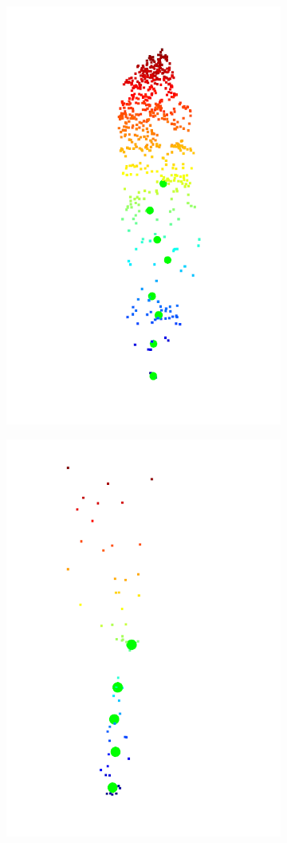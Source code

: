 \begin{figure}
  \begin{subfigure}{0.5\textwidth}
    \centering
    \includegraphics[width=0.8\linewidth]{imaxes/centroides1.png}
  \end{subfigure}%
  \begin{subfigure}{0.5\textwidth}
    \centering
    \includegraphics[width=0.8\linewidth]{imaxes/centroide2.png}

\end{subfigure}
\end{figure}

